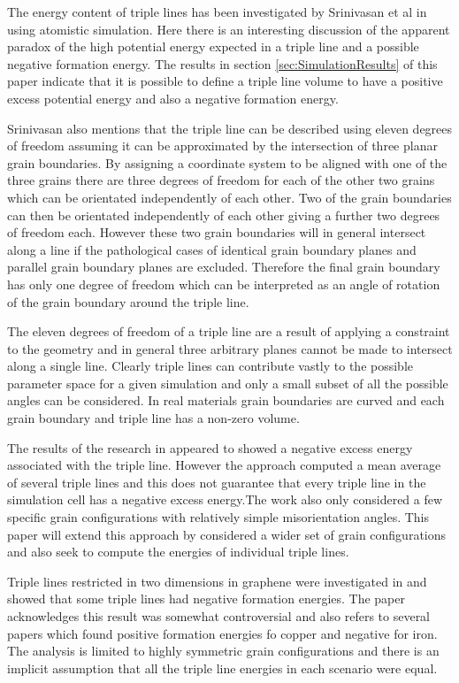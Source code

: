 \documentclass[12pt,a4paper]{book}
\begin{document}
The energy content of triple lines has been investigated by Srinivasan et al in \cite{Srinivasan1999} using atomistic simulation. Here there is an interesting discussion of the apparent paradox of the high potential energy expected in a triple line and a possible negative formation energy. The results in section \ref{sec:SimulationResults} of this paper indicate that it is possible to define a triple line volume to have a positive excess potential energy and also a negative formation energy. 

Srinivasan also mentions that the triple line can be described using eleven degrees of freedom assuming it can be approximated by the intersection of three planar grain boundaries. By assigning a coordinate system to be aligned with one of the three grains there are three degrees of freedom for each of the other two grains which can be orientated independently of each other. Two of the grain boundaries can then be orientated independently of each other giving a further two degrees of freedom each. However these two grain boundaries will in general intersect along a line if the pathological cases of identical grain boundary planes and parallel grain boundary planes are excluded. Therefore the final grain boundary has only one degree of freedom which can be interpreted as an angle of rotation of the grain boundary around the triple line.

The eleven degrees of freedom of a triple line are a result of applying a constraint to the geometry and in general three arbitrary planes cannot be made to intersect along a single line. Clearly triple lines can contribute vastly to the possible parameter space for a given simulation and only a small subset of all the possible angles can be considered. In real materials grain boundaries are curved and each grain boundary and triple line has a non-zero volume.

The results of the research in \citep{Srinivasan1999} appeared to showed a negative excess energy associated with the triple line. However the approach computed a mean average of several triple lines and this does not guarantee that every triple line in the simulation cell has a negative excess energy.The work also only considered a few specific grain configurations with relatively simple misorientation angles. This paper will extend this approach by considered a wider set of grain configurations and also seek to compute the energies of individual triple lines.

Triple lines restricted in two dimensions in graphene were  investigated in \citep{Hirvonen2017} and showed that some triple lines had negative formation energies. The paper acknowledges this result was somewhat controversial and also refers to several papers which found positive formation energies fo copper and negative for iron. The analysis is limited to highly symmetric grain configurations and there is an implicit assumption that all the triple line energies in each scenario were equal.
\end{document}
